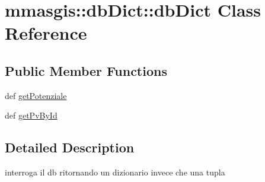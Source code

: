 \hypertarget{classmmasgis_1_1dbDict_1_1dbDict}{
\section{mmasgis::dbDict::dbDict Class Reference}
\label{classmmasgis_1_1dbDict_1_1dbDict}
}
\subsection*{Public Member Functions}
\begin{DoxyCompactItemize}
\item 
def \hyperlink{classmmasgis_1_1dbDict_1_1dbDict_aca1f1f332177869a3e55e6804f32e9ce}{getPotenziale}
\item 
def \hyperlink{classmmasgis_1_1dbDict_1_1dbDict_a392f07dcda37df8e5267fa35be77a05c}{getPvById}
\end{DoxyCompactItemize}


\subsection{Detailed Description}
\begin{DoxyVerb}
interroga il db ritornando un dizionario invece che una tupla
\end{DoxyVerb}
 


